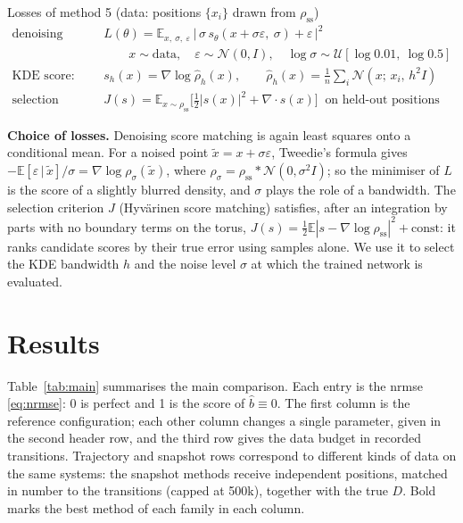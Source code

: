 \documentclass[11pt,a4paper]{article}
\newcommand{\E}{\mathbb{E}}
\newcommand{\rss}{\rho_{\mathrm{ss}}}
\begin{document}
\begin{lossbox}{Losses of method 5 (data: positions $\{x_i\}$ drawn from $\rss$)}
\vspace{-0.4em}
\begin{align*}
\text{denoising score matching:}\quad
  & L(\theta) = \E_{x,\ \sigma,\ \varepsilon}\
    \big|\,\sigma\, s_\theta(x+\sigma\varepsilon,\ \sigma) + \varepsilon\,\big|^2 \\
  & \qquad x\sim\text{data},\quad \varepsilon\sim\mathcal N(0,I),\quad
    \log\sigma\sim\mathcal U[\log 0.01,\ \log 0.5] \\
\text{KDE score:}\quad
  & s_h(x) = \nabla\log\hat\rho_h(x),
    \qquad \hat\rho_h(x)=\frac1n\sum_i \mathcal N(x;\,x_i,\,h^2 I) \\
\text{selection (both):}\quad
  & J(s) = \E_{x\sim\rss}\Big[\tfrac12|s(x)|^2 + \nabla\!\cdot s(x)\Big]
    \ \text{ on held-out positions}
\end{align*}
\vspace{-1.2em}
\end{lossbox}

\textbf{Choice of losses.} Denoising score matching is again least squares onto a
conditional mean. For a noised point $\tilde x = x+\sigma\varepsilon$, Tweedie's formula gives
$-\E[\varepsilon\,|\,\tilde x]/\sigma = \nabla\log\rho_\sigma(\tilde x)$, where
$\rho_\sigma=\rss*\mathcal N(0,\sigma^2 I)$; so the minimiser of $L$ is the score of a
slightly blurred density, and $\sigma$ plays the role of a bandwidth. The selection criterion
$J$ (Hyv\"arinen score matching) satisfies, after an integration by parts with no boundary
terms on the torus, $J(s)=\tfrac12\E|s-\nabla\log\rss|^2+\text{const}$: it ranks candidate
scores by their true error using samples alone. We use it to select the KDE bandwidth $h$ and
the noise level $\sigma$ at which the trained network is evaluated.

\section{Results}

Table~\ref{tab:main} summarises the main comparison. Each entry is the nrmse
\eqref{eq:nrmse}: 0 is perfect and 1 is the score of $\hat b\equiv0$. The first column is
the reference configuration; each other column changes a single parameter, given in the
second header row, and the third row gives the data budget in recorded transitions.
Trajectory and snapshot rows correspond to different kinds of data on the same systems: the
snapshot methods receive independent positions, matched in number to the transitions
(capped at 500k), together with the true $D$. Bold marks the best method of each family in
each column.
\end{document}

